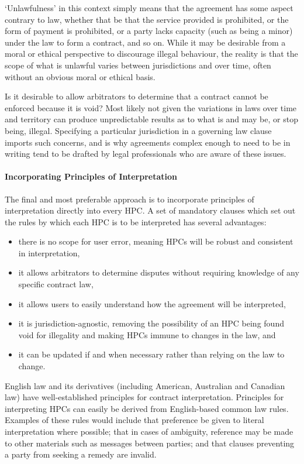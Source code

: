 \documentclass[a4paper,12pt]{article}
\begin{document}
`Unlawfulness' in this context simply means that the agreement has some aspect contrary to law, whether that be that the service provided is prohibited, or the form of payment is prohibited, or a party lacks capacity (such as being a minor) under the law to form a contract, and so on. While it may be desirable from a moral or ethical perspective to discourage illegal behaviour, the reality is that the scope of what is unlawful varies between jurisdictions and over time, often without an obvious moral or ethical basis.

Is it desirable to allow arbitrators to determine that a contract cannot be enforced because it is void? Most likely not given the variations in laws over time and territory can produce unpredictable results as to what is and may be, or stop being, illegal. Specifying a particular jurisdiction in a governing law clause imports such concerns, and is why agreements complex enough to need to be in writing tend to be drafted by legal professionals who are aware of these issues.

\paragraph{Incorporating Principles of Interpretation}

The final and most preferable approach is to incorporate principles of interpretation directly into every HPC. A set of mandatory clauses which set out the rules by which each HPC is to be interpreted has several advantages:

\begin{itemize}
	\item there is no scope for user error, meaning HPCs will be robust and consistent in interpretation,
	\item it allows arbitrators to determine disputes without requiring knowledge of any specific contract law,
	\item it allows users to easily understand how the agreement will be interpreted,
	\item it is jurisdiction-agnostic, removing the possibility of an HPC being found void for illegality and making HPCs immune to changes in the law, and
	\item it can be updated if and when necessary rather than relying on the law to change.
\end{itemize}

English law and its derivatives (including American, Australian and Canadian law) have well-established principles for contract interpretation. Principles for interpreting HPCs can easily be derived from English-based common law rules. Examples of these rules would include that preference be given to literal interpretation where possible; that in cases of ambiguity, reference may be made to other materials such as messages between parties; and that clauses preventing a party from seeking a remedy are invalid.
\end{document}
